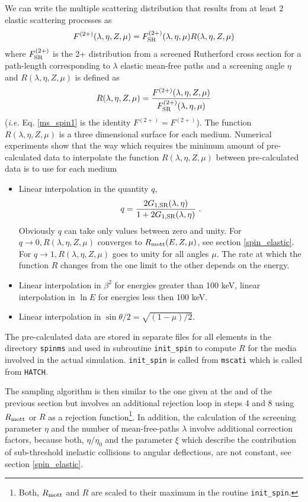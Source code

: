 We can write the multiple scattering distribution
that results from at least 2 elastic scattering processes as
\begin{equation}
\label{ms_spin1}
F^{(2+)}(\lambda,\eta,Z,\mu) = F^{(2+)}_{\rm SR}(\lambda,\eta,\mu)
R(\lambda,\eta,Z,\mu)
\end{equation}
where $F^{(2+)}_{\rm SR}$ is the 2+ distribution from a
screened Rutherford cross section for a path-length corresponding
to $\lambda$ elastic mean-free paths and a screening angle $\eta$
and $R(\lambda,\eta,Z,\mu)$ is defined as
\begin{equation}
 R(\lambda,\eta,Z,\mu) = {F^{(2+)}(\lambda,\eta,Z,\mu) \over
F^{(2+)}_{\rm SR}(\lambda,\eta,\mu)}
\end{equation}
({\em i.e.} Eq. \eqref{ms_spin1} is the identity $F^{(2+)}=F^{(2+)}$).
The function $R(\lambda,\eta,Z,\mu)$ is a three dimensional
surface for each medium.
Numerical experiments show that the way which requires the minimum
amount of pre-calculated data to interpolate
the function $R(\lambda,\eta,Z,\mu)$ between pre-calculated
data is to use for each medium
\begin{itemize}
\item
Linear interpolation in the quantity $q$,
\begin{equation}
q = {2 G_{1,{\rm SR}}(\lambda,\eta) \over 1 + 2 G_{1,{\rm SR}}(\lambda,\eta)}~.
\end{equation}
Obviously $q$ can take only values between zero and unity. For
$q \to 0, R(\lambda,\eta,Z,\mu)$ converges to $R_{\rm mott}(E,Z,\mu)$,
see section \ref{spin_elastic}. For $q \to 1, R(\lambda,\eta,Z,\mu)$
goes to unity for all angles $\mu$. The rate at which the function
$R$ changes from the one limit to the other depends on the energy.
\item
Linear interpolation in $\beta^2$ for energies greater than
100 keV, linear interpolation in $\ln E$ for energies less
then 100 keV.
\item
Linear interpolation in $\sin \theta/2 = \sqrt{(1-\mu)/2}$.
\end{itemize}
The pre-calculated data are stored in separate files for
all elements in the directory {\tt spinms} and used
in subroutine {\tt init\_spin} to compute $R$ for
the media involved in the actual simulation. {\tt init\_spin}
is called from {\tt mscati} which is called from {\tt HATCH}.

The sampling algorithm is then similar to the one given at the
and of the previous section but involves an additional rejection
loop in steps 4 and 8 using $R_{\rm mott}$ or $R$ as a
rejection function\footnote{Both, $R_{\rm mott}$ and $R$ are
scaled to their maximum in the routine {\tt init\_spin}.}.
In addition, the calculation of the screening parameter
$\eta$ and the number of mean-free-paths $\lambda$ involve
additional correction factors, because both, $\eta/\eta_0$ and
the parameter $\xi$ which describe the contribution
of sub-threshold inelastic collisions to angular deflections,
are not constant, see section \ref{spin_elastic}.

